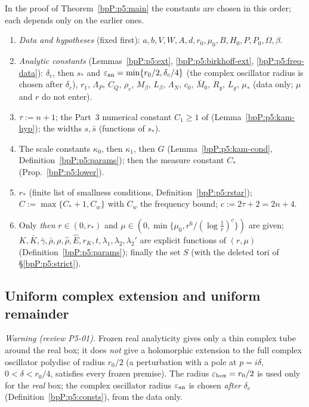 \begin{remark}\label{bpP:p5:order}
In the proof of Theorem~\ref{bpP:p5:main} the constants are chosen in this order; each depends only on the earlier ones.
\begin{enumerate}
\item \emph{Data and hypotheses} (fixed first): $a,b,V,W,A,d,r_0,\mu_0,B,H_0,P,P_0,\Omega,\beta$.
\item \emph{Analytic constants} (Lemmas~\ref{bpP:p5:ext}, \ref{bpP:p5:birkhoff-ext}, \ref{bpP:p5:freq-data}): $\delta_c$, then $s_*$ and $\varepsilon_{\rm an}=\min\{r_0/2,\delta_c/4\}$ (the complex oscillator radius is chosen after $\delta_c$), $r_1,\,\Lambda_P,\,C_Q,\,\rho_c,\,M_\beta,\,L_\beta,\,\Lambda_N,\,c_0,\,\bar M_0,\,R_y,\,L_g,\,\mu_*$ (data only; $\mu$ and $r$ do not enter).
\item $\tau:=n+1$; the Part~3 numerical constant $C_1\ge1$ of  (Lemma~\ref{bpP:p5:kam-hyp}); the widths $s,\bar s$ (functions of $s_*$).
\item The scale constants $\kappa_0$, then $\kappa_1$, then $G$ (Lemma~\ref{bpP:p5:kam-cond}, Definition~\ref{bpP:p5:params}); then the measure constant $C_*$ (Prop.~\ref{bpP:p5:lower}).
\item $r_*$ (finite list of smallness conditions, Definition~\ref{bpP:p5:rstar}); $C:=\max\{C_*+1,C_w\}$ with $C_w$ the frequency bound; $c:=2\tau+2=2n+4$.
\item Only \emph{then} $r\in(0,r_*)$ and $\mu\in(0,\min\{\mu_0,r^6/(\log\frac1r)^c\})$ are given; $K,\bar K,\bar\gamma,\bar\rho,\rho,\hat\rho,\hat E,r_K,t,\lambda_1,\lambda_2,\lambda_2'$ are explicit functions of $(r,\mu)$ (Definition~\ref{bpP:p5:params}); finally the set $S$ (with the deleted tori of \S\ref{bpP:p5:strict}).
\end{enumerate}
\end{remark}

\subsection{Uniform complex extension and uniform remainder}\label{bpP:p5:unif}

\emph{Warning (review P5-01).} Frozen real analyticity gives only a thin complex tube around the real box; it does \emph{not} give a holomorphic extension to the full complex oscillator polydisc of radius $r_0/2$ (a perturbation with a pole at $p=i\delta$, $0<\delta<r_0/4$, satisfies every frozen premise). The radius $\varepsilon_{\rm box}=r_0/2$ is used only for the \emph{real} box; the complex oscillator radius $\varepsilon_{\rm an}$ is chosen \emph{after} $\delta_c$ (Definition~\ref{bpP:p5:consts}), from the data only.


